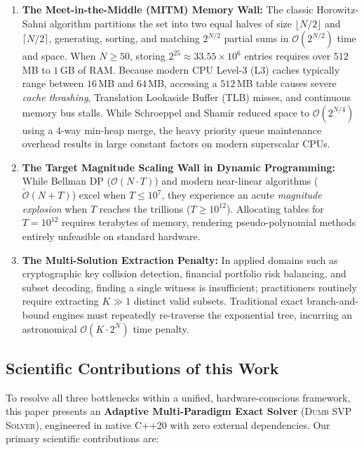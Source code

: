 \documentclass[journal,onecolumn,11pt]{IEEEtran}
\begin{document}
\begin{enumerate}
    \item \textbf{The Meet-in-the-Middle (MITM) Memory Wall:} The classic Horowitz-Sahni algorithm \cite{horowitz1974computing} partitions the set into two equal halves of size $\lfloor N/2 \rfloor$ and $\lceil N/2 \rceil$, generating, sorting, and matching $2^{N/2}$ partial sums in $\mathcal{O}(2^{N/2})$ time and space. When $N \ge 50$, storing $2^{25} \approx 33.55 \times 10^6$ entries requires over $512$\,MB to $1$\,GB of RAM. Because modern CPU Level-3 (L3) caches typically range between $16$\,MB and $64$\,MB, accessing a $512$\,MB table causes severe \textit{cache thrashing}, Translation Lookaside Buffer (TLB) misses, and continuous memory bus stalls. While Schroeppel and Shamir \cite{schroeppel1981t} reduced space to $\mathcal{O}(2^{N/4})$ using a $4$-way min-heap merge, the heavy priority queue maintenance overhead results in large constant factors on modern superscalar CPUs.
    
    \item \textbf{The Target Magnitude Scaling Wall in Dynamic Programming:} While Bellman DP ($\mathcal{O}(N \cdot T)$) and modern near-linear algorithms ($\widetilde{\mathcal{O}}(N + T)$) excel when $T \le 10^7$, they experience an acute \textit{magnitude explosion} when $T$ reaches the trillions ($T \ge 10^{12}$). Allocating tables for $T = 10^{12}$ requires terabytes of memory, rendering pseudo-polynomial methods entirely unfeasible on standard hardware.
    
    \item \textbf{The Multi-Solution Extraction Penalty:} In applied domains such as cryptographic key collision detection, financial portfolio risk balancing, and subset decoding, finding a single witness is insufficient; practitioners routinely require extracting $K \gg 1$ distinct valid subsets. Traditional exact branch-and-bound engines must repeatedly re-traverse the exponential tree, incurring an astronomical $\mathcal{O}(K \cdot 2^N)$ time penalty.
\end{enumerate}

\subsection{Scientific Contributions of this Work}
To resolve all three bottlenecks within a unified, hardware-conscious framework, this paper presents an \textbf{Adaptive Multi-Paradigm Exact Solver} (\textsc{Dumb SVP Solver}), engineered in native C++20 with zero external dependencies. Our primary scientific contributions are:
\end{document}
